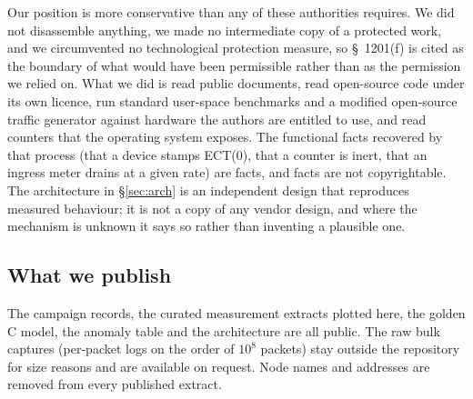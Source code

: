 Our position is more conservative than any of these authorities requires. We
did not disassemble anything, we made no intermediate copy of a protected work,
and we circumvented no technological protection measure, so \S~1201(f) is
cited as the boundary of what would have been permissible rather than as the
permission we relied on. What we did is read public documents, read
open-source code under its own licence, run standard user-space benchmarks and
a modified open-source traffic generator against hardware the authors are
entitled to use, and read counters that the operating system exposes. The
functional facts recovered by that process (that a device stamps ECT(0), that a
counter is inert, that an ingress meter drains at a given rate) are facts, and
facts are not copyrightable. The architecture in \S\ref{sec:arch} is an
independent design that reproduces measured behaviour; it is not a copy of any
vendor design, and where the mechanism is unknown it says so rather than
inventing a plausible one.

\subsection{What we publish}

The campaign records, the curated measurement extracts plotted here, the golden
C model, the anomaly table and the architecture are all public. The raw bulk
captures (per-packet logs on the order of $10^8$ packets) stay outside the
repository for size reasons and are available on request. Node names and
addresses are removed from every published extract.
